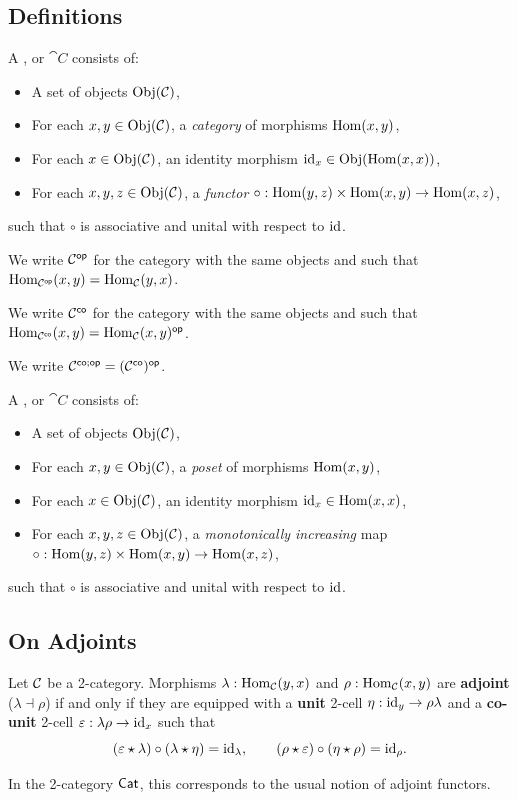 \documentclass[a4paper]{memoir}
\begin{document}
\subsection{Definitions}
\begin{definition}
	A ,  or  $\cat C$ consists of:
	\begin{itemize}
		\item A set of objects $\mathrm{Obj}(\mathcal{C})$,
		\item For each $x, y \in \mathrm{Obj}(\mathcal{C})$, a \emph{category} of morphisms ${\mathrm{Hom}}(x, y)$,
		\item For each $x \in \mathrm{Obj}(\mathcal{C})$, an identity morphism $\mathrm{id}_x \in \mathrm{Obj}({\mathrm{Hom}}(x, x))$,
		\item For each $x, y, z \in \mathrm{Obj}(\mathcal{C})$, a \emph{functor} $\circ : {\mathrm{Hom}}(y, z) \times {\mathrm{Hom}}(x, y) \to {\mathrm{Hom}}(x, z)$,
	\end{itemize}
	such that $\circ$ is associative and unital with respect to $\mathrm{id}$.
	
	We write ${\mathcal{C}}^{\mathsf{op}}$ for the category with the same objects and such that ${\mathrm{Hom}}_{{\mathcal{C}}^{\mathsf{op}}}(x, y) = {\mathrm{Hom}}_{\mathcal{C}}(y, x)$.
	
	We write ${\mathcal{C}}^{\mathsf{co}}$ for the category with the same objects and such that ${\mathrm{Hom}}_{{\mathcal{C}}^{\mathsf{co}}}(x, y) = {\mathrm{Hom}}_{{\mathcal{C}}}(x, y)^{\mathsf{op}}$.
	
	We write ${\mathcal{C}}^{\mathsf{co};\mathsf{op}} = ({\mathcal{C}}^{\mathsf{co}})^{\mathsf{op}}$.
\end{definition}
\begin{definition}
	A ,  or  $\cat C$ consists of:
	\begin{itemize}
		\item A set of objects $\mathrm{Obj}(\mathcal{C})$,
		\item For each $x, y \in \mathrm{Obj}(\mathcal{C})$, a \emph{poset} of morphisms ${\mathrm{Hom}}(x, y)$,
		\item For each $x \in \mathrm{Obj}(\mathcal{C})$, an identity morphism $\mathrm{id}_x \in {\mathrm{Hom}}(x, x)$,
		\item For each $x, y, z \in \mathrm{Obj}(\mathcal{C})$, a \emph{monotonically increasing} map $\circ : {\mathrm{Hom}}(y, z) \times {\mathrm{Hom}}(x, y) \to {\mathrm{Hom}}(x, z)$,
	\end{itemize}
	such that $\circ$ is associative and unital with respect to $\mathrm{id}$.
\end{definition}

\subsection{On Adjoints}
\begin{definition}
	Let ${\mathcal{C}}$ be a 2-category.
	Morphisms $\lambda : {\mathrm{Hom}}_{\mathcal{C}}(y, x)$ and $\rho : {\mathrm{Hom}}_{\mathcal{C}}(x, y)$ are \textbf{adjoint} ($\lambda \dashv \rho$) if and only if they are equipped with a \textbf{unit} 2-cell $\eta : \mathrm{id}_y \to \rho \lambda$ and a \textbf{co-unit} 2-cell $\varepsilon : \lambda \rho \to \mathrm{id}_x$ such that
	\[
		(\varepsilon \star \lambda) \circ (\lambda \star \eta) = \mathrm{id}_\lambda, \qquad
		(\rho \star \varepsilon) \circ (\eta \star \rho) = \mathrm{id}_\rho.
	\]
\end{definition}
In the 2-category ${\mathsf{Cat}}$, this corresponds to the usual notion of adjoint functors.
\end{document}
